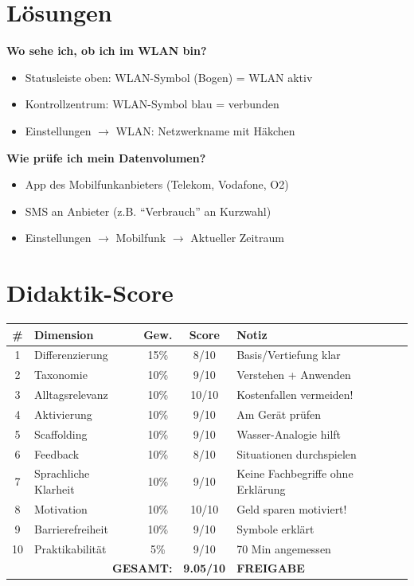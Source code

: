 \documentclass[11pt,a4paper]{article}
\begin{document}
\section{Lösungen}

\textbf{Wo sehe ich, ob ich im WLAN bin?}
\begin{itemize}
    \item Statusleiste oben: WLAN-Symbol (Bogen) = WLAN aktiv
    \item Kontrollzentrum: WLAN-Symbol blau = verbunden
    \item Einstellungen $\rightarrow$ WLAN: Netzwerkname mit Häkchen
\end{itemize}

\textbf{Wie prüfe ich mein Datenvolumen?}
\begin{itemize}
    \item App des Mobilfunkanbieters (Telekom, Vodafone, O2)
    \item SMS an Anbieter (z.B. ``Verbrauch'' an Kurzwahl)
    \item Einstellungen $\rightarrow$ Mobilfunk $\rightarrow$ Aktueller Zeitraum
\end{itemize}

\section{Didaktik-Score}

\begin{scorebox}
\begin{tabular}{|c|l|c|c|p{3.5cm}|}
\hline
\# & Dimension & Gew. & Score & Notiz \\
\hline
1 & Differenzierung & 15\% & 8/10 & Basis/Vertiefung klar \\
2 & Taxonomie & 10\% & 9/10 & Verstehen + Anwenden \\
3 & Alltagsrelevanz & 10\% & 10/10 & Kostenfallen vermeiden! \\
4 & Aktivierung & 10\% & 9/10 & Am Gerät prüfen \\
5 & Scaffolding & 10\% & 9/10 & Wasser-Analogie hilft \\
6 & Feedback & 10\% & 8/10 & Situationen durchspielen \\
7 & Sprachliche Klarheit & 10\% & 9/10 & Keine Fachbegriffe ohne Erklärung \\
8 & Motivation & 10\% & 10/10 & Geld sparen motiviert! \\
9 & Barrierefreiheit & 10\% & 9/10 & Symbole erklärt \\
10 & Praktikabilität & 5\% & 9/10 & 70 Min angemessen \\
\hline
\multicolumn{3}{|r|}{\textbf{GESAMT:}} & \textbf{9.05/10} & \textcolor{successgreen}{\textbf{FREIGABE}} \\
\hline
\end{tabular}
\end{scorebox}
\end{document}
